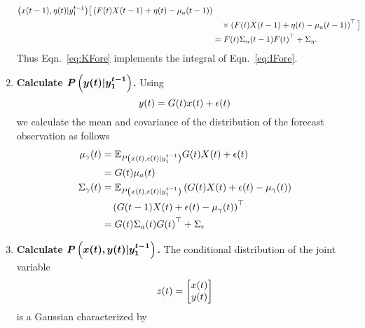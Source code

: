 \begin{enumerate}
\begin{align}
{       \left({x}{(t-1)},{\eta}{(t)}|y_{1}^{t-1} \right)} \big[
     \left( {F}{(t)}{X}{(t-1)} + {\eta}{(t)} - {\mu_a}{(t-1)}
     \right) \nonumber\\
     & \quad \times \left( {F}{(t)}{X}{(t-1)} + {\eta}{(t)} -
       {\mu_a}{(t-1)} \right)^\top \big] \\
    &= {F}{(t)}{\Sigma_\alpha}{(t-1)}{F}{(t)}^\top +
    \Sigma_\eta .
  \end{align}
  Thus Eqn.~\eqref{eq:KFore} implements the integral of
  Eqn.~\eqref{eq:IFore}.
\item \label{PYforecast} \textbf{Calculate
    $\bm{P\left({y}{(t)}|y_{1}^{t-1} \right)}$.}  Using
  \begin{equation*}
    {y}{(t)} = {G}{(t)}{x}{(t)} + {\epsilon}{(t)}
  \end{equation*}
  we calculate the mean and covariance of the distribution of the
  forecast observation as follows
  \begin{align}
    {\mu_\gamma}{(t)} &= \mathbb{E}_{P
      \left({x}{(t)},{\epsilon}{(t)}|y_{1}^{t-1} \right)}
    {G}{(t)}{X}{(t)} + {\epsilon}{(t)} \nonumber \\
    \label{eq:mugamma}
    &= {G}{(t)}{\mu_a}{(t)}\\
    {\Sigma_\gamma}{(t)} &= \mathbb{E}_{P
      \left({x}{(t)},{\epsilon}{(t)}|y_{1}^{t-1} \right)}
    \left( {G}{(t)}{X}{(t)} + {\epsilon}{(t)} -
      {\mu_\gamma}{(t)} \right) \nonumber \\
    &\quad\left( {G}{(t-1)}{X}{(t)} +
      {\epsilon}{(t)} - {\mu_\gamma}{(t)}
    \right)^\top \nonumber \\
    \label{eq:Sigmagamma}
    &= {G}{(t)}{\Sigma_a}{(t)}{G}{(t)}^\top +
    \Sigma_\epsilon
  \end{align}
\item \label{PZforecast} \textbf{Calculate $\bm{P\left({x}{(t)},
        {y}{(t)}|y_{1}^{t-1} \right)}$.}  The conditional
  distribution of the joint variable
  \begin{equation*}
    {z}{(t)} =
    \begin{bmatrix}
      {x}{(t)}\\
      {y}{(t)}
    \end{bmatrix}
  \end{equation*}
  is a Gaussian characterized by
  \begin{equation*}

\end{equation*}
\end{enumerate}
